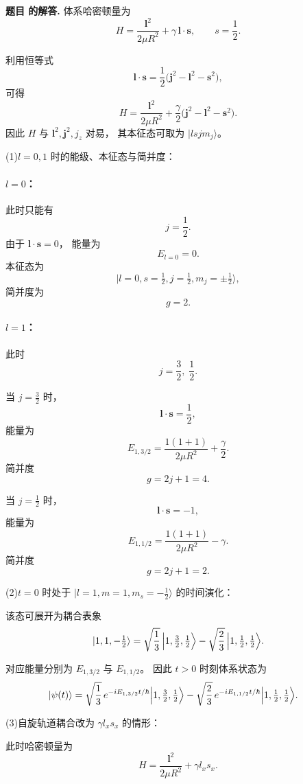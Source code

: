 \documentclass[12pt, a4paper, oneside]{ctexart}
\newcounter{problemname}
\newenvironment{solution}
  {\par\noindent\textbf{题目 \theproblemname 的解答. }}
  {\par}
\begin{document}
\begin{solution}
体系哈密顿量为
\[
H=\frac{\boldsymbol{l}^2}{2\mu R^2}+\gamma\,\boldsymbol{l}\cdot\boldsymbol{s},
\qquad s=\frac12 .
\]

利用恒等式
\[
\boldsymbol{l}\cdot\boldsymbol{s}
=\frac12\bigl(\boldsymbol{j}^2-\boldsymbol{l}^2-\boldsymbol{s}^2\bigr),
\]
可得
\[
H=\frac{\boldsymbol{l}^2}{2\mu R^2}
+\frac{\gamma}{2}\bigl(\boldsymbol{j}^2-\boldsymbol{l}^2-\boldsymbol{s}^2\bigr).
\]
因此 $H$ 与 $\boldsymbol{l}^2,\boldsymbol{j}^2,j_z$ 对易，
其本征态可取为 $|l s j m_j\rangle$。

\medskip
\noindent
(1)\;$l=0,1$ 时的能级、本征态与简并度：

\paragraph{$l=0$：}
此时只能有
\[
j=\frac12.
\]
由于 $\boldsymbol{l}\cdot\boldsymbol{s}=0$，
能量为
\[
E_{l=0}
=0.
\]
本征态为
\[
|l=0,s=\tfrac12,j=\tfrac12,m_j=\pm\tfrac12\rangle,
\]
简并度为
\[
g=2.
\]

\paragraph{$l=1$：}
此时
\[
j=\frac32,\;\frac12.
\]

当 $j=\frac32$ 时，
\[
\boldsymbol{l}\cdot\boldsymbol{s}
=\frac12,
\]
能量为
\[
E_{1,3/2}
=\frac{1(1+1)}{2\mu R^2}
+\frac{\gamma}{2}.
\]
简并度
\[
g=2j+1=4.
\]

当 $j=\frac12$ 时，
\[
\boldsymbol{l}\cdot\boldsymbol{s}=-1,
\]
能量为
\[
E_{1,1/2}
=\frac{1(1+1)}{2\mu R^2}
-\gamma.
\]
简并度
\[
g=2j+1=2.
\]

\medskip
\noindent
(2)\;$t=0$ 时处于 $|l=1,m=1,m_s=-\tfrac12\rangle$ 的时间演化：

该态可展开为耦合表象
\[
|1,1,-\tfrac12\rangle
=\sqrt{\frac{1}{3}}\,\Bigl|1,\tfrac32,\tfrac12\Bigr\rangle
-\sqrt{\frac{2}{3}}\,\Bigl|1,\tfrac12,\tfrac12\Bigr\rangle.
\]

对应能量分别为 $E_{1,3/2}$ 与 $E_{1,1/2}$。
因此 $t>0$ 时刻体系状态为
\[
\begin{aligned}
|\psi(t)\rangle
&=\sqrt{\frac13}\,
e^{-iE_{1,3/2}t/\hbar}
\Bigl|1,\tfrac32,\tfrac12\Bigr\rangle
-\sqrt{\frac23}\,
e^{-iE_{1,1/2}t/\hbar}
\Bigl|1,\tfrac12,\tfrac12\Bigr\rangle .
\end{aligned}
\]

\medskip
\noindent
(3)\;自旋轨道耦合改为 $\gamma l_x s_x$ 的情形：

此时哈密顿量为
\[
H=\frac{\boldsymbol{l}^2}{2\mu R^2}+\gamma l_x s_x.
\]


\end{solution}
\end{document}

